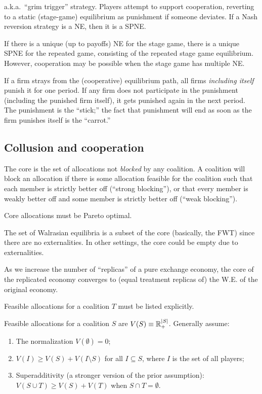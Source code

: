 \documentclass[8pt,letterpaper, landscape]{extarticle} %
\begin{document}
\begin{multicols}{3}
\begin{description}
 a.k.a.\ ``grim trigger'' strategy.  Players attempt to support cooperation, reverting to a static (stage-game) equilibrium as punishment if someone deviates. If a Nash reversion strategy is a NE, then it is a SPNE.

 If there is a unique (up to payoffs) NE for the stage game, there is a unique SPNE for the repeated game, consisting of the repeated stage game equilibrium. However, cooperation may be possible when the stage game has multiple NE.

 If a firm strays from the (cooperative) equilibrium path, all firms \textit{including itself} punish it for one period. If any firm does not participate in the punishment (including the punished firm itself), it gets punished again in the next period. The punishment is the ``stick;'' the fact that punishment will end as soon as the firm punishes itself is the ``carrot.''

\subsection{Collusion and cooperation}
 The core is the set of allocations not \textit{blocked} by any coalition. A coalition will block an allocation if there is some allocation feasible for the coalition such that each member is strictly better off (``strong blocking''), or that every member is weakly better off and some member is strictly better off (``weak blocking'').

Core allocations must be Pareto optimal.

The set of Walrasian equilibria is a subset of the core (basically, the FWT) since there are no externalities. In other settings, the core could be empty due to externalities.

 As we increase the number of ``replicas'' of a pure exchange economy, the core of the replicated economy converges to (equal treatment replicas of) the W.E. of the original economy.

 Feasible allocations for a coalition $ T $ must be listed explicitly.

 Feasible allocations for a coalition $ S $ are $ V(S) \equiv \mathbb{R}_+^{\lvert S \rvert} $. Generally assume:
\begin{enumerate}
\item The normalization $ V ( \emptyset ) = 0 $;
\item $ V(I) \geq V(S) + V (I \setminus S) $ for all $ I \subseteq S $, where $ I $ is the set of all players;
\item Superadditivity (a stronger version of the prior assumption): $ V(S \cup T) \geq V(S) + V(T) $ when $ S \cap T = \emptyset $.
\end{enumerate}


\end{description}
\end{multicols}
\end{document}

